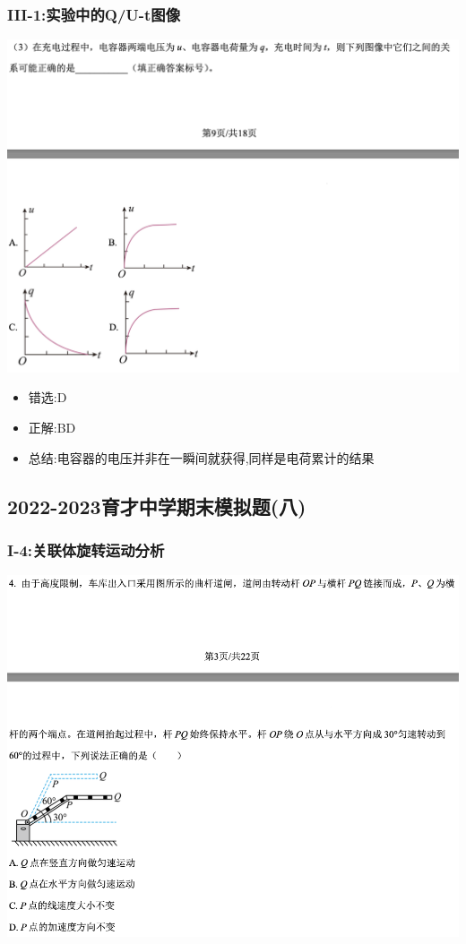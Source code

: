 \documentclass{article}
\begin{document}
\subsubsection{III-1:实验中的Q/U-t图像}
\includegraphics[width=50em,keepaspectratio]{./pictures/1.1-4.png}

\begin{itemize}
    \item 错选:\quad D
    \item 正解:\quad BD
    \item 总结:\quad 电容器的电压并非在一瞬间就获得,同样是电荷累计的结果
\end{itemize}

\vspace{2em}

\subsection{2022-2023育才中学期末模拟题(八)}

\subsubsection{I-4:关联体旋转运动分析}
\includegraphics[width=50em,keepaspectratio]{./pictures/1.2-1.png}
\end{document}
